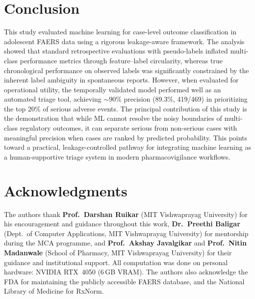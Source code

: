\documentclass[10pt]{article}
\newcommand{\FAERS}{\textsf{FAERS}\xspace}
\begin{document}
\section{Conclusion}
This study evaluated machine learning for case-level outcome classification in adolescent FAERS data using a rigorous leakage-aware framework. The analysis showed that standard retrospective evaluations with pseudo-labels inflated multi-class performance metrics through feature--label circularity, whereas true chronological performance on observed labels was significantly constrained by the inherent label ambiguity in spontaneous reports. However, when evaluated for operational utility, the temporally validated model performed well as an automated triage tool, achieving $\sim$90\% precision (89.3\%, 419/469) in prioritizing the top 20\% of serious adverse events. The principal contribution of this study is the demonstration that while ML cannot resolve the noisy boundaries of multi-class regulatory outcomes, it can separate serious from non-serious cases with meaningful precision when cases are ranked by predicted probability. This points toward a practical, leakage-controlled pathway for integrating machine learning as a human-supportive triage system in modern pharmacovigilance workflows.


\section{Acknowledgments}
The authors thank \textbf{Prof.\ Darshan Ruikar} (MIT Vishwaprayag University) for his encouragement and guidance throughout this work, \textbf{Dr.\ Preethi Baligar} (Dept.\ of Computer Applications, MIT Vishwaprayag University) for mentorship during the MCA programme, and \textbf{Prof.\ Akshay Javalgikar} and \textbf{Prof.\ Nitin Madanwale} (School of Pharmacy, MIT Vishwaprayag University) for their guidance and institutional support. All computation was done on personal hardware: NVIDIA RTX~4050 (6\,GB VRAM). The authors also acknowledge the FDA for maintaining the publicly accessible \FAERS database, and the National Library of Medicine for RxNorm.

\end{document}
